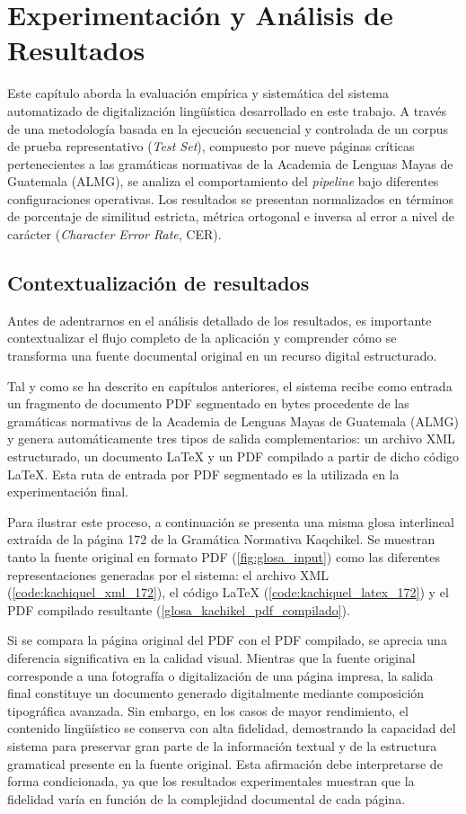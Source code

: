 \chapter{Experimentación y Análisis de Resultados}
\label{cap:resultados}

Este capítulo aborda la evaluación empírica y sistemática del sistema automatizado de digitalización lingüística desarrollado en este trabajo. A través de una metodología basada en la ejecución secuencial y controlada de un corpus de prueba representativo (\textit{Test Set}), compuesto por nueve páginas críticas pertenecientes a las gramáticas normativas de la Academia de Lenguas Mayas de Guatemala (ALMG), se analiza el comportamiento del \textit{pipeline} bajo diferentes configuraciones operativas. Los resultados se presentan normalizados en términos de porcentaje de similitud estricta, métrica ortogonal e inversa al error a nivel de carácter (\textit{Character Error Rate}, CER).

\section{Contextualización de resultados}

Antes de adentrarnos en el análisis detallado de los resultados, es importante contextualizar el flujo completo de la aplicación y comprender cómo se transforma una fuente documental original en un recurso digital estructurado.

Tal y como se ha descrito en capítulos anteriores, el sistema recibe como entrada un fragmento de documento PDF segmentado en bytes procedente de las gramáticas normativas de la Academia de Lenguas Mayas de Guatemala (ALMG) y genera automáticamente tres tipos de salida complementarios: un archivo XML estructurado, un documento LaTeX y un PDF compilado a partir de dicho código LaTeX. Esta ruta de entrada por PDF segmentado es la utilizada en la experimentación final.

Para ilustrar este proceso, a continuación se presenta una misma glosa interlineal extraída de la página 172 de la Gramática Normativa Kaqchikel. Se muestran tanto la fuente original en formato PDF (\ref{fig:glosa_input}) como las diferentes representaciones generadas por el sistema: el archivo XML (\ref{code:kachiquel_xml_172}), el código LaTeX (\ref{code:kachiquel_latex_172}) y el PDF compilado resultante (\ref{glosa_kachikel_pdf_compilado}).

Si se compara la página original del PDF con el PDF compilado, se aprecia una diferencia significativa en la calidad visual. Mientras que la fuente original corresponde a una fotografía o digitalización de una página impresa, la salida final constituye un documento generado digitalmente mediante composición tipográfica avanzada. Sin embargo, en los casos de mayor rendimiento, el contenido lingüístico se conserva con alta fidelidad, demostrando la capacidad del sistema para preservar gran parte de la información textual y de la estructura gramatical presente en la fuente original. Esta afirmación debe interpretarse de forma condicionada, ya que los resultados experimentales muestran que la fidelidad varía en función de la complejidad documental de cada página.

